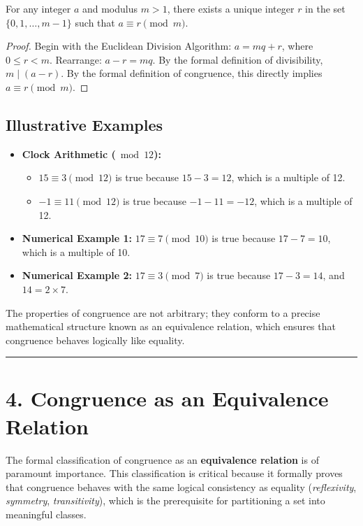 \begin{theorem}
For any integer $a$ and modulus $m > 1$, there exists a unique integer $r$ in the set $\{0, 1, \dots, m-1\}$ such that $a \equiv r \pmod{m}$.
\end{theorem}
\begin{proof}
Begin with the Euclidean Division Algorithm: $a = mq + r$, where $0 \leq r < m$. Rearrange: $a - r = mq$. By the formal definition of divisibility, $m \mid (a - r)$. By the formal definition of congruence, this directly implies $a \equiv r \pmod{m}$.
\end{proof}

\subsection*{Illustrative Examples}
\begin{itemize}
    \item \textbf{Clock Arithmetic ($\bmod 12$):}
    \begin{itemize}
        \item $15 \equiv 3 \pmod{12}$ is true because $15 - 3 = 12$, which is a multiple of 12.
        \item $-1 \equiv 11 \pmod{12}$ is true because $-1 - 11 = -12$, which is a multiple of 12.
    \end{itemize}
    \item \textbf{Numerical Example 1:} $17 \equiv 7 \pmod{10}$ is true because $17 - 7 = 10$, which is a multiple of 10.
    \item \textbf{Numerical Example 2:} $17 \equiv 3 \pmod{7}$ is true because $17 - 3 = 14$, and $14 = 2 \times 7$.
\end{itemize}
The properties of congruence are not arbitrary; they conform to a precise mathematical structure known as an equivalence relation, which ensures that congruence behaves logically like equality. 

\hrule

\section*{4. Congruence as an Equivalence Relation}
The formal classification of congruence as an \textbf{equivalence relation} is of paramount importance. This classification is critical because it formally proves that congruence behaves with the same logical consistency as equality (\textit{reflexivity}, \textit{symmetry}, \textit{transitivity}), which is the prerequisite for partitioning a set into meaningful classes.

